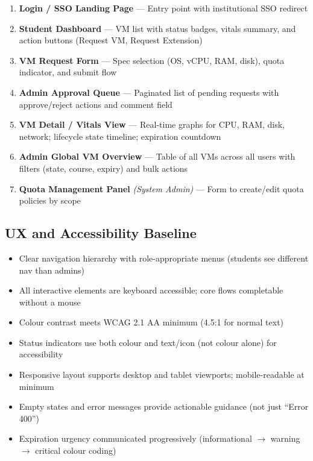 \documentclass[12pt,letterpaper]{article}
\begin{document}
\begin{enumerate}
  \item \textbf{Login / SSO Landing Page} --- Entry point with institutional SSO redirect
  \item \textbf{Student Dashboard} --- VM list with status badges, vitals summary, and action buttons (Request VM, Request Extension)
  \item \textbf{VM Request Form} --- Spec selection (OS, vCPU, RAM, disk), quota indicator, and submit flow
  \item \textbf{Admin Approval Queue} --- Paginated list of pending requests with approve/reject actions and comment field
  \item \textbf{VM Detail / Vitals View} --- Real-time graphs for CPU, RAM, disk, network; lifecycle state timeline; expiration countdown
  \item \textbf{Admin Global VM Overview} --- Table of all VMs across all users with filters (state, course, expiry) and bulk actions
  \item \textbf{Quota Management Panel} \textit{(System Admin)} --- Form to create/edit quota policies by scope
\end{enumerate}

\subsection{UX and Accessibility Baseline}

\begin{itemize}
  \item Clear navigation hierarchy with role-appropriate menus (students see different nav than admins)
  \item All interactive elements are keyboard accessible; core flows completable without a mouse
  \item Colour contrast meets WCAG 2.1 AA minimum (4.5:1 for normal text)
  \item Status indicators use both colour and text/icon (not colour alone) for accessibility
  \item Responsive layout supports desktop and tablet viewports; mobile-readable at minimum
  \item Empty states and error messages provide actionable guidance (not just ``Error 400'')
  \item Expiration urgency communicated progressively (informational $\to$ warning $\to$ critical colour coding)
\end{itemize}
\end{document}
